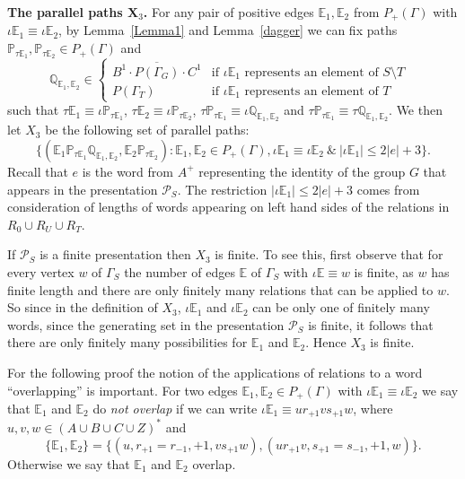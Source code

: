 \documentclass[11pt]{amsart}
\theoremstyle{plain}
\begin{document}
\noindent \textbf{The parallel paths $\mathbf X_3$.} For any pair of positive edges ${\mathbb{E}}_1, {\mathbb{E}}_2$ from $P_+(\Gamma)$ with 
$\iota {\mathbb{E}}_1 \equiv \iota {\mathbb{E}}_2$, by Lemma~\ref{Lemma1} and Lemma~\ref{dagger} we can fix paths ${\mathbb{P}}_{\tau {\mathbb{E}}_1}, {\mathbb{P}}_{\tau {\mathbb{E}}_2} \in P_+(\Gamma)$ and 
\[
{\mathbb{Q}}_{{\mathbb{E}}_1, {\mathbb{E}}_2} \in 
\begin{cases}
\overline{B^1 \cdot P(\Gamma_G) \cdot C^1} & \mbox{if $\iota {\mathbb{E}}_1$ represents an element of $S \setminus T$ } \\
P(\Gamma_T) & \mbox{if $\iota {\mathbb{E}}_1$ represents an element of $T$ }
\end{cases}
\]
such that $\tau {\mathbb{E}}_1 \equiv \iota {\mathbb{P}}_{\tau {\mathbb{E}}_1}$, $\tau {\mathbb{E}}_2 \equiv \iota {\mathbb{P}}_{\tau {\mathbb{E}}_2}$, $\tau {\mathbb{P}}_{\tau {\mathbb{E}}_1} \equiv \iota {\mathbb{Q}}_{{\mathbb{E}}_1, {\mathbb{E}}_2}$ and $\tau {\mathbb{P}}_{\tau {\mathbb{E}}_1} \equiv \tau {\mathbb{Q}}_{{\mathbb{E}}_1, {\mathbb{E}}_2}$. We then let $X_3$ be the following set of parallel paths:
\[
\{
({\mathbb{E}}_1 {\mathbb{P}}_{\tau {\mathbb{E}}_1} {\mathbb{Q}}_{{\mathbb{E}}_1, {\mathbb{E}}_2}, {\mathbb{E}}_2 {\mathbb{P}}_{\tau {\mathbb{E}}_2}   ): 
{\mathbb{E}}_1, {\mathbb{E}}_2 \in P_+(\Gamma), 
\iota {\mathbb{E}}_1 \equiv \iota {\mathbb{E}}_2 \ \& \ | \iota {\mathbb{E}}_1 | \leq 2 |e| + 3
\}.
\]
Recall that $e$ is the word from $A^+$ representing the identity of the group $G$ that appears in the presentation $\mathcal{P}_S$. The restriction $|\iota {\mathbb{E}}_1| \leq 2|e| + 3$ comes from consideration of lengths of words appearing on left hand sides of the relations in $R_0 \cup R_U \cup R_T$. 

If $\mathcal{P}_S$ is a finite presentation then $X_3$ is finite. To see this, first observe that for every vertex $w$ of $\Gamma_S$ the number of edges ${\mathbb{E}}$ of $\Gamma_S$ with $\iota {\mathbb{E}} \equiv w$ is finite, as $w$ has finite length and there are only finitely many relations that can be applied to $w$. So since in the definition of $X_3$, $\iota {\mathbb{E}}_1$ and $\iota {\mathbb{E}}_2$ can be only one of finitely many words, since the generating set in the presentation $\mathcal{P}_S$ is finite, it follows that there are only finitely many possibilities for ${\mathbb{E}}_1$ and ${\mathbb{E}}_2$. Hence $X_3$ is finite. 

For the following proof the notion of the applications of relations to a word ``overlapping'' is important. For two edges ${\mathbb{E}}_1, {\mathbb{E}}_2 \in P_+(\Gamma)$ with $\iota {\mathbb{E}}_1 \equiv \iota {\mathbb{E}}_2$ we say that ${\mathbb{E}}_1$ and ${\mathbb{E}}_2$ do \emph{not overlap} if we can write 
$\iota {\mathbb{E}}_1 \equiv u r_{+1} v s_{+1} w$, where $u,v,w \in (A \cup B \cup C \cup Z)^*$ and 
\[
\{ {\mathbb{E}}_1, {\mathbb{E}}_2  \} = \{(u, r_{+1} = r_{-1}, +1, v s_{+1} w), (u r_{+1} v, s_{+1} = s_{-1}, +1, w)  \}. 
\]
Otherwise we say that ${\mathbb{E}}_1$ and ${\mathbb{E}}_2$ overlap.  
\end{document}
